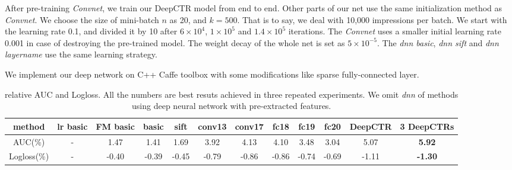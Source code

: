 \documentclass{sig-alternate}
\begin{document}
After pre-training  \emph{Convnet}, we train our DeepCTR model from end to end. Other parts of our net use the same  initialization method as  \emph{Convnet}. We choose the size of mini-batch $n$ as 20, and $k = 500$. That is to say, we deal with 10,000 impressions per batch.  We start with the learning rate 0.1, and divided it by 10 after $6\times10^{4}$, $1\times10^{5}$ and $1.4\times10^{5}$ iterations. The \emph{Convnet} uses a smaller initial learning rate 0.001 in case of destroying the pre-trained model. The weight decay of the whole net is set as $5\times 10^{-5}$. The \emph{dnn basic}, \emph{dnn sift} and \emph{dnn layername} use the same learning strategy. 

We implement our deep network on C++ Caffe toolbox \cite{jia2014caffe} with some modifications like sparse fully-connected layer.
\begin{table}
	\centering
	\caption{relative AUC and Logloss. All the numbers are   best resuts achieved in three repeated experiments. We omit \emph{dnn} of methods using deep neural network with pre-extracted features.}
	\label{table:AUC}
	\begin{tabular}{|c|c c c c|c c c c c|c c|} \hline
		method  & lr basic &FM basic &  basic &sift &conv13 &conv17 &fc18 &fc19 &fc20 &DeepCTR &3 DeepCTRs \\  \hline
		AUC(\%) & -        &  1.47 & 1.41  &1.69 &  3.92 &4.13   &4.10 &3.48 &3.04 &5.07    &\textbf{5.92} \\  \hline
		Logloss(\%)&-      &  -0.40 & -0.39 &-0.45& -0.79 & -0.86 &-0.86&-0.74&-0.69&-1.11   & \textbf{-1.30}\\ \hline
	\end{tabular}
\end{table}
\end{document}
